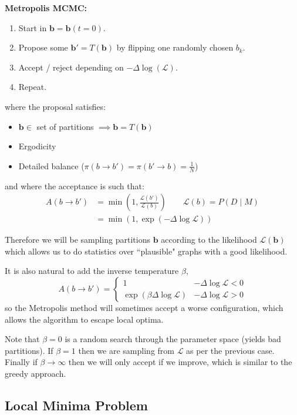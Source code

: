 \documentclass[12pt]{article}
\theoremstyle{definition}
\newcommand{\B}[1]{\boldsymbol{\boldsymbol{#1}}}
\newcommand{\Lcal}{\mathcal{L}}
\newcommand{\given}{\;|\;}
\newcommand{\br}[1]{\left({#1}\right)}
\begin{document}
\textbf{Metropolis MCMC:}
\begin{enumerate}
    \item Start in $\boldsymbol{ b} = \boldsymbol{b}(t=0)$. 
    \item Propose some $\boldsymbol{b}' = T(\boldsymbol{b})$ by flipping one randomly chosen $b_{k}$.
    \item Accept / reject depending on $-\Delta \log (\mathcal L)$. 
    \item Repeat. 
\end{enumerate}
where the proposal satisfies: 
\begin{itemize}
    \item $\B{b}\in$ set of partitions $\implies \B{b}=T(\B{b})$ 
    \item Ergodicity
    \item Detailed balance ($\pi\br{b\to b'}=\pi\br{b'\to b}=\frac{1}{N}$)
\end{itemize}

and where the acceptance is such that: 
\begin{align*}
    A\br{b\to b'} &= \min\br{1,\frac{\Lcal\br{b'}}{\Lcal\br{b}}}\qquad \Lcal\br{b} = P\br{D\given M}\\
    &=\min\br{1,\exp\br{-\Delta\log\Lcal}}
\end{align*}

Therefore we will be sampling partitions $\B b$ according to the likelihood $\mathcal L(\B b)$ which allows us to do statistics over ``plausible" graphs with a good likelihood.

It is also natural to add the inverse temperature $\beta$, 
\[
A\br{b\to b'} = \begin{cases}
    1 & -\Delta\log\Lcal<0\\
    \exp\br{\beta\Delta\log\Lcal} & -\Delta\log\Lcal>0
\end{cases}
\]
so the Metropolis method will sometimes accept a worse configuration, which allows the algorithm to escape local optima. 

Note that $\beta=0$ is a random search through the parameter space (yields bad partitions). If $\beta=1$ then we are sampling from $\mathcal L$ as per the previous case. Finally if $\beta\to \infty$ then we will only accept if we improve, which is similar to the greedy approach. 

\subsection{Local Minima Problem}
\end{document}

